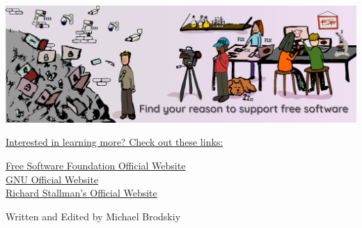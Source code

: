\documentclass[12pt]{article}
\begin{document}
 \begin{center}
   \includegraphics[width=.9\textwidth]{Images/reason.png}
 \end{center}

 \begin{center}
   \vspace{10pt}
   \underline{Interested in learning more? Check out these links:}
 \end{center}

 \begin{center}
   \href{fsf.org}{Free Software Foundation Official Website}\\\vspace{10pt}
   \href{gnu.org}{GNU Official Website}\\\vspace{10pt}
   \href{stallman.org}{Richard Stallman's Official Website}\\\vspace{10pt}
 \end{center}

 \begin{center}
   \tiny Written and Edited by Michael Brodskiy
 \end{center}
 
\end{document}
